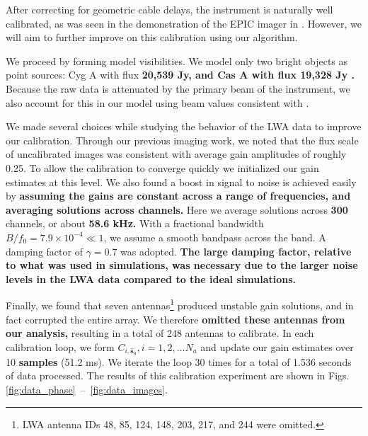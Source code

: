\documentclass[a4paper,fleqn,usenatbib]{../mnras}
\begin{document}
After correcting for geometric cable delays, the instrument is naturally well calibrated, as was 
seen in the demonstration of the EPIC imager in \citealt{thy15c}. However, we will aim to 
further improve on this calibration using our algorithm.

We proceed by forming model visibilities. We model only two bright objects as point sources: 
Cyg A with flux \textbf{20,539 Jy, and Cas A with flux 19,328 Jy \citep{lan12}. }
Because the raw data is attenuated by the primary beam of the instrument, we also account for 
this in our model using beam values consistent with \cite{hic12}.

We made several choices while studying the behavior of the LWA data to improve our 
calibration. Through our previous imaging work, we noted that the flux scale of uncalibrated 
images was consistent with average gain amplitudes of roughly 0.25. To allow the calibration to 
converge quickly we initialized our gain estimates at this level. 
We also found a boost in signal to noise is achieved easily by \textbf{assuming the gains are
constant across a range of frequencies, and averaging solutions across channels.}
Here we average solutions across \textbf{300} channels, or about \textbf{58.6 kHz.} 
With a fractional bandwidth $B/f_0 = 7.9 \times 10^{-4} \ll 1$, we assume a smooth bandpass 
across the band. 
A damping factor of $\gamma = 0.7$ was adopted.
\textbf{The large damping factor, relative to what was used in simulations, was necessary due to
the larger noise levels in the LWA data compared to the ideal simulations.}

Finally, we found that seven antennas\footnote{LWA antenna IDs 48, 85, 124, 148, 203, 217, 
and 244 were omitted.} produced unstable gain solutions, and in fact corrupted the entire array. 
We therefore \textbf{omitted these antennas from our analysis,} resulting in a total of 248 antennas to 
calibrate. In each calibration loop, we form $C_{i,\hat{\boldsymbol{s}}_0}, i=1,2,\ldots N_a$ and 
update our gain estimates over 10 \textbf{samples} (51.2 ms). We iterate the loop 30 times for a 
total of 1.536 seconds of data processed. The results of this calibration experiment are shown in Figs.~
\ref{fig:data_phase}~--~\ref{fig:data_images}.
\end{document}
